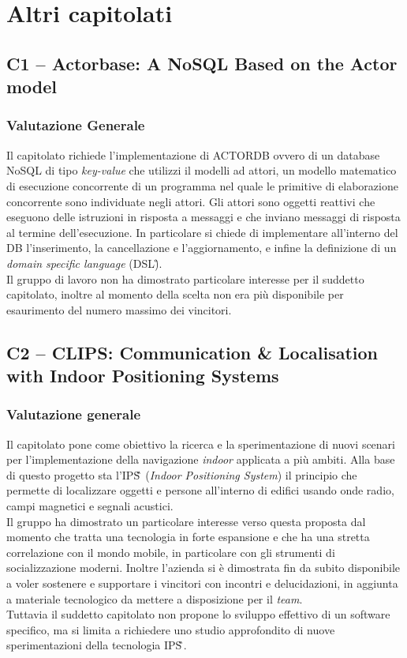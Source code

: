 \section{Altri capitolati}
\subsection {C1 – Actorbase: A NoSQL Based on the Actor model}
\subsubsection{Valutazione Generale}
Il capitolato richiede l'implementazione di ACTORDB ovvero di un database NoSQL di tipo \textit{key-value} che utilizzi il modelli ad attori, un modello matematico di esecuzione concorrente di un programma nel quale le primitive di elaborazione concorrente sono individuate negli attori. Gli attori sono oggetti reattivi che eseguono delle istruzioni in risposta a messaggi e che inviano messaggi di risposta al termine dell'esecuzione. In particolare si chiede di implementare all'interno del DB l'inserimento, la cancellazione e l'aggiornamento, e infine la definizione di un \textit{domain specific language} (DSL\G).\\
Il gruppo di lavoro non ha dimostrato particolare interesse per il suddetto capitolato, inoltre al momento della scelta non era più disponibile per esaurimento del numero massimo dei vincitori.

\subsection {C2 – CLIPS: Communication \& Localisation with Indoor Positioning Systems}
\subsubsection{Valutazione generale}
Il capitolato pone come obiettivo la ricerca e la sperimentazione di nuovi scenari per l'implementazione della navigazione \textit{indoor} applicata a più ambiti. Alla base di questo progetto sta l'IPS\G\, (\textit{Indoor Positioning System}) il principio che permette di localizzare oggetti e persone all'interno di edifici usando onde radio, campi magnetici e segnali acustici. \\
Il gruppo ha dimostrato un particolare interesse verso questa proposta dal momento che tratta una tecnologia in forte espansione e che ha una stretta correlazione con il mondo mobile, in particolare con gli strumenti di socializzazione moderni. Inoltre l'azienda si è dimostrata fin da subito disponibile a voler sostenere e supportare i vincitori con incontri e delucidazioni, in aggiunta a materiale tecnologico da mettere a disposizione per il \textit{team}.\\
Tuttavia il suddetto capitolato non propone lo sviluppo effettivo di un software specifico, ma si limita a richiedere uno studio approfondito di nuove sperimentazioni della tecnologia IPS\G\,.

